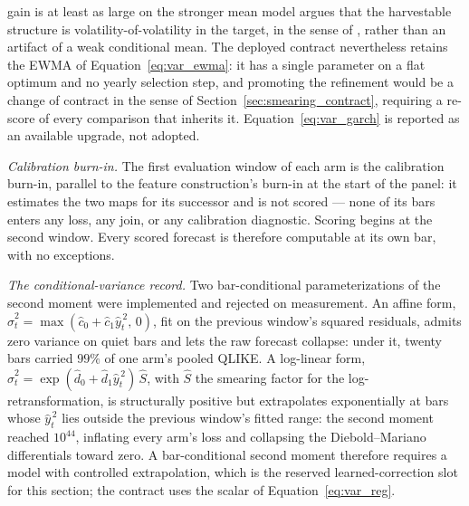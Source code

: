 gain is at least as large on the stronger mean model argues that the
harvestable structure is volatility-of-volatility in the target, in
the sense of \citet{CorsiMittnikPigorschPigorsch2008}, rather than an
artifact of a weak conditional mean. The deployed contract
nevertheless retains the EWMA of Equation~\eqref{eq:var_ewma}: it has
a single parameter on a flat optimum and no yearly selection step, and
promoting the refinement would be a change of contract in the sense of
Section~\ref{sec:smearing_contract}, requiring a re-score of every
comparison that inherits it. Equation~\eqref{eq:var_garch} is reported
as an available upgrade, not adopted.

\emph{Calibration burn-in.} The first evaluation window of each arm is
the calibration burn-in, parallel to the feature construction's burn-in
at the start of the panel: it estimates the two maps for its successor
and is not scored --- none of its bars enters any loss, any join, or any
calibration diagnostic. Scoring begins at the second window. Every
scored forecast is therefore computable at its own bar, with no
exceptions.

\emph{The conditional-variance record.} Two bar-conditional
parameterizations of the second moment were implemented and rejected on
measurement. An affine form,
$\hat{\sigma}^2_t = \max(\hat{c}_0 + \hat{c}_1 \hat{y}_t^{\,2},\, 0)$,
fit on the previous window's squared residuals, admits zero variance on
quiet bars and lets the raw forecast collapse: under it, twenty bars
carried $99\%$ of one arm's pooled QLIKE. A log-linear form,
$\hat{\sigma}^2_t
= \exp(\hat{d}_0 + \hat{d}_1 \hat{y}_t^{\,2})\,\hat{S}$, with $\hat{S}$
the \citet{Duan1983} smearing factor for the log-retransformation, is
structurally positive but extrapolates exponentially at bars whose
$\hat{y}_t^{\,2}$ lies outside the previous window's fitted range: the
second moment reached $10^{44}$, inflating every arm's loss and
collapsing the Diebold--Mariano differentials toward zero. A
bar-conditional second moment therefore requires a model with controlled
extrapolation, which is the reserved learned-correction slot for this
section; the contract uses the scalar of Equation~\eqref{eq:var_reg}.

